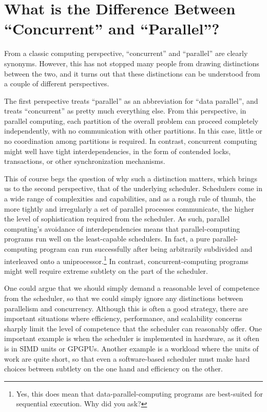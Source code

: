 
\section{What is the Difference Between ``Concurrent'' and ``Parallel''?}
\label{sec:app:questions:What is the Difference Between ``Concurrent'' and ``Parallel''?}

From a classic computing perspective, ``concurrent'' and ``parallel''
are clearly synonyms.
However, this has not stopped many people from drawing distinctions
between the two, and it turns out that these distinctions can be
understood from a couple of different perspectives.

The first perspective treats ``parallel'' as an abbreviation for
``data parallel'', and treats ``concurrent'' as pretty much everything
else.
From this perspective, in parallel computing, each partition of the
overall problem can proceed completely independently, with no
communication with other partitions.
In this case, little or no coordination among partitions is required.
In contrast, concurrent computing might well have tight interdependencies,
in the form of contended locks, transactions, or other synchronization
mechanisms.

\QuickQuizEnd

This of course begs the question of why such a distinction matters,
which brings us to the second perspective, that of the underlying scheduler.
Schedulers come in a wide range of complexities and capabilities, and
as a rough rule of thumb, the more tightly and irregularly a set of
parallel processes communicate, the higher the level of sophistication
required from the scheduler.
As such, parallel computing's avoidance of interdependencies means that
parallel-computing programs run well on the least-capable schedulers.
In fact, a pure parallel-computing program can run successfully after
being arbitrarily subdivided and interleaved onto a uniprocessor.\footnote{
	Yes, this does mean that data-parallel-computing programs are
	best-suited for sequential execution.
	Why did you ask?}
In contrast, concurrent-computing programs might well require extreme
subtlety on the part of the scheduler.

One could argue that we should simply demand a reasonable level of
competence from the scheduler, so that we could simply ignore any
distinctions between parallelism and concurrency.
Although this is often a good strategy,
there are important situations where efficiency,
performance, and scalability concerns sharply limit the level
of competence that the scheduler can reasonably offer.
One important example is when the scheduler is implemented in
hardware, as it often is in SIMD units or GPGPUs.
Another example is a workload where the units of work are quite
short, so that even a software-based scheduler must make hard choices
between subtlety on the one hand and efficiency on the other.

